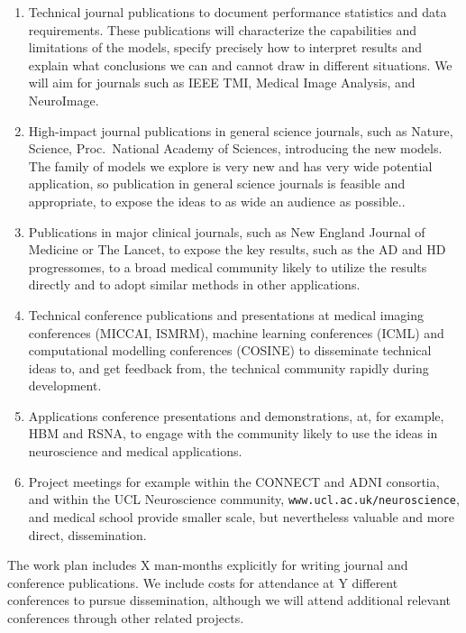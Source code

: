 \documentclass[a4paper,11pt]{article}
\begin{document}
\begin{enumerate}

\item Technical journal publications to document performance
statistics and data requirements.  These publications will
characterize the capabilities and limitations of the models, specify
precisely how to interpret results and explain what conclusions we can
and cannot draw in different situations.  We will aim for journals
such as IEEE TMI, Medical Image Analysis, and NeuroImage.

\item High-impact journal publications in general science journals,
such as Nature, Science, Proc.\ National Academy of Sciences,
introducing the new models.  The family of models we explore is very
new and has very wide potential application, so publication in general
science journals is feasible and appropriate, to expose the ideas to
as wide an audience as possible..

\item Publications in major clinical journals, such as New England
Journal of Medicine or The Lancet, to expose the key results, such as
the AD and HD progressomes, to a broad medical community likely to
utilize the results directly and to adopt similar methods in other
applications.

\item Technical conference publications and presentations at medical
imaging conferences (MICCAI, ISMRM), machine learning conferences
(ICML) and computational modelling conferences (COSINE) to disseminate
technical ideas to, and get feedback from, the technical community
rapidly during development.

\item Applications conference presentations and demonstrations, at, for
example, HBM and RSNA, to engage with the community likely to use the
ideas in neuroscience and medical applications.

\item Project meetings for example within the CONNECT and ADNI
consortia, and within the UCL Neuroscience community,
\verb+www.ucl.ac.uk/neuroscience+, and medical school provide smaller
scale, but nevertheless valuable and more direct, dissemination.

\end{enumerate}

The work plan includes X man-months explicitly for writing
journal and conference publications.  We include costs for attendance
at Y different conferences to pursue dissemination, although we will
attend additional relevant conferences through other related projects.
\end{document}
